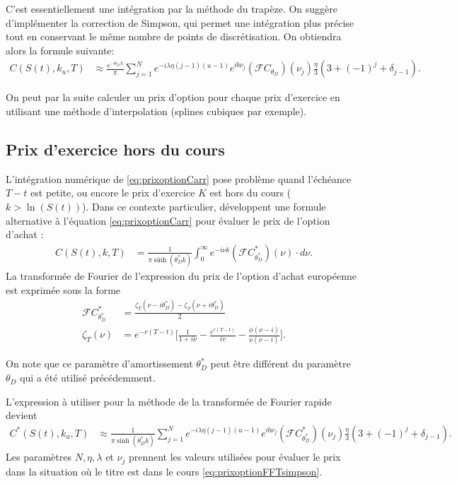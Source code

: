 C'est essentiellement une intégration par la méthode du trapèze. On
suggère d'implémenter la correction de Simpson, qui permet une
intégration plus précise tout en conservant le même nombre de points
de discrétisation. On obtiendra alors la formule suivante:
\begin{align}
  C(S(t),k_u,T) &\approx \frac{e^{-\theta_D\,k}}{\pi} \sum_{j=1}^N
  e^{-i\lambda\eta(j-1)(u-1)} e^{ib\nu_j}
  (\mathcal{F}C_{\theta_D})(\nu_j) \frac{\eta}{3} \left(3 + (-1)^j +
    \delta_{j-1}\right). \label{eq:prixoptionFFTsimpson}
\end{align}

On peut par la suite calculer un prix d'option pour chaque prix
d'exercice en utilisant une méthode d'interpolation (splines cubiques
par exemple).

\subsection{Prix d'exercice hors du cours}
\label{sec:outofmoneyfft}

L'intégration numérique de \eqref{eq:prixoptionCarr} pose problème
quand l'échéance $T-t$ est petite, ou encore le prix d'exercice $K$
est hors du cours ($k > \ln(S(t))$). Dans ce contexte particulier,
\cite{carr1999option} développent une formule alternative à l'équation
\eqref{eq:prixoptionCarr} pour évaluer le prix de l'option d'achat :
\begin{align}
  C(S(t),k,T) &= \frac{1}{\pi\sinh(\theta^{*}_D k)} \int_{0}^{\infty}
  e^{-i\nu k} (\mathcal{F}C^{*}_{\theta^{*}_D})(\nu)\cdot
  d\nu. \label{eq:prixoptionCarrOOM}
\end{align}
La transformée de Fourier de l'expression du prix de l'option d'achat
européenne est exprimée sous la forme
\begin{align}
  \mathcal{F}C^{*}_{\theta^{*}_D} &= \frac{\zeta_T(\nu-i\theta^{*}_D) - \zeta_T(\nu+i\theta^{*}_D)}{2}\\
  \zeta_T(\nu) &= e^{-r(T-t)}\bigg[\frac{1}{1+i\nu} -
  \frac{e^{r(T-t)}}{iv} - \frac{\phi(\nu-i)}{\nu(\nu-i)} \bigg].
  \nonumber
\end{align}

On note que ce paramètre d'amortissement $\theta^{*}_D$ peut être
différent du paramètre $\theta_D$ qui a été utilisé précédemment.

L'expression à utiliser pour la méthode de la transformée de Fourier
rapide devient
\begin{align}
  C^{*}(S(t),k_u,T) &\approx \frac{1}{\pi\sinh(\theta^{*}_D k)}
  \sum_{j=1}^N e^{-i\lambda\eta(j-1)(u-1)} e^{ib\nu_j}
  (\mathcal{F}C^{*}_{\theta^{*}_D})(\nu_j) \frac{\eta}{3} \left(3 +
    (-1)^j + \delta_{j-1}\right). \label{eq:prixoptionFFTsimpsonOOM}
\end{align}
Les paramètres $N ,\eta, \lambda$ et $\nu_j$ prennent les valeurs
utilisées pour évaluer le prix dans la situation où le titre est dans
le cours \eqref{eq:prixoptionFFTsimpson}.

